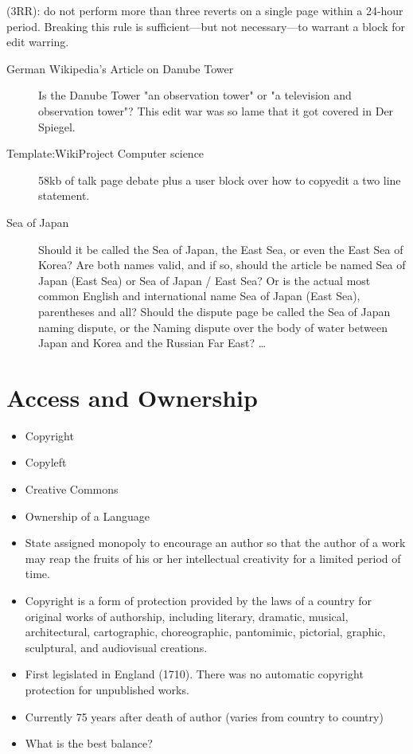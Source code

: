 \documentclass[a4paper,landscape,headrule,footrule,xetex]{foils}
\begin{document}
 (3RR): do not perform more than three reverts on a
single page within a 24-hour period. Breaking this rule is
sufficient—but not necessary—to warrant a block for edit warring.




\begin{description}
\item [German Wikipedia's Article on Danube Tower]
Is the Danube Tower "an observation tower" or "a television and observation tower"? This edit war was so lame that it got covered in Der Spiegel.
\item [Template:WikiProject Computer science]
58kb of talk page debate plus a user block over how to copyedit a two line statement.
\item [Sea of Japan]
Should it be called the Sea of Japan, the East Sea, or even the East Sea of Korea? Are both names valid, and if so, should the article be named Sea of Japan (East Sea) or Sea of Japan / East Sea? Or is the actual most common English and international name Sea of Japan (East Sea), parentheses and all? Should the dispute page be called the Sea of Japan naming dispute, or the Naming dispute over the body of water between Japan and Korea and the Russian Far East? \ldots
\end{description}

\section{Access and Ownership}
\MyLogo{}


\begin{itemize}
\item Copyright
\item Copyleft
\item Creative Commons
\item Ownership of a Language
\end{itemize}


\begin{itemize}
\item State assigned monopoly to encourage an author so that the author of a
  work may reap the fruits of his or her intellectual creativity for a
  limited period of time.
\item Copyright is a form of protection provided by the laws of a
  country for original works of authorship, including literary,
  dramatic, musical, architectural, cartographic, choreographic,
  pantomimic, pictorial, graphic, sculptural, and audiovisual
  creations.
\item First legislated in England (1710). There was no automatic copyright protection for unpublished works.
\item Currently 75 years after death of author (varies from country to country)
\item What is the best balance?
\end{itemize}
\end{document}
